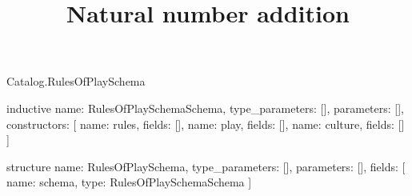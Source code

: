 \begin{lexlean}{Catalog.RulesOfPlaySchema}
\title{Natural number addition}
\begin{semanticmodule}
inductive{
  name: RulesOfPlaySchemaSchema,
  type_parameters: [],
  parameters: [],
  constructors: [
    {name: rules, fields: []},
    {name: play, fields: []},
    {name: culture, fields: []}
  ]
}

structure{
  name: RulesOfPlaySchema,
  type_parameters: [],
  parameters: [],
  fields: [
    {name: schema, type: RulesOfPlaySchemaSchema}
  ]
}
\end{semanticmodule}
\end{lexlean}
